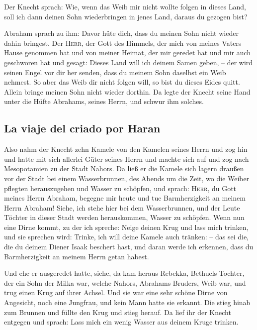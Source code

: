  Der Knecht sprach: Wie, wenn das Weib mir nicht wollte
folgen in dieses Land, soll ich dann deinen Sohn wiederbringen in jenes
Land, daraus du gezogen bist?

 Abraham sprach zu ihm: Davor hüte dich, dass du meinen
Sohn nicht wieder dahin bringest.  Der \textsc{Herr}, der
Gott des Himmels, der mich von meines Vaters Hause genommen hat und von
meiner Heimat, der mir geredet hat und mir auch geschworen hat und
gesagt: Dieses Land will ich deinem Samen geben, -- der wird seinen
Engel vor dir her senden, dass du meinem Sohn daselbst ein Weib nehmest.
 So aber das Weib dir nicht folgen will, so bist du dieses
Eides quitt. Allein bringe meinen Sohn nicht wieder dorthin.
 Da legte der Knecht seine Hand unter die Hüfte Abrahams,
seines Herrn, und schwur ihm solches.

\hypertarget{la-viaje-del-criado-por-haran}{%
\subsection{La viaje del criado por
Haran}\label{la-viaje-del-criado-por-haran}}

 Also nahm der Knecht zehn Kamele von den Kamelen seines
Herrn und zog hin und hatte mit sich allerlei Güter seines Herrn und
machte sich auf und zog nach Mesopotamien zu der Stadt Nahors.
 Da ließ er die Kamele sich lagern draußen vor der Stadt
bei einem Wasserbrunnen, des Abends um die Zeit, wo die Weiber pflegten
herauszugehen und Wasser zu schöpfen,  und sprach:
\textsc{Herr}, du Gott meines Herrn Abraham, begegne mir heute und tue
Barmherzigkeit an meinem Herrn Abraham!  Siehe, ich stehe
hier bei dem Wasserbrunnen, und der Leute Töchter in dieser Stadt werden
herauskommen, Wasser zu schöpfen.  Wenn nun eine Dirne
kommt, zu der ich spreche: Neige deinen Krug und lass mich trinken, und
sie sprechen wird: Trinke, ich will deine Kamele auch tränken: -- das
sei die, die du deinem Diener Isaak beschert hast, und daran werde ich
erkennen, dass du Barmherzigkeit an meinem Herrn getan habest.

 Und ehe er ausgeredet hatte, siehe, da kam heraus
Rebekka, Bethuels Tochter, der ein Sohn der Milka war, welche Nahors,
Abrahams Bruders, Weib war, und trug einen Krug auf ihrer Achsel.
 Und sie war eine sehr schöne Dirne von Angesicht, noch
eine Jungfrau, und kein Mann hatte sie erkannt. Die stieg hinab zum
Brunnen und füllte den Krug und stieg herauf.  Da lief
ihr der Knecht entgegen und sprach: Lass mich ein wenig Wasser aus
deinem Kruge trinken.

